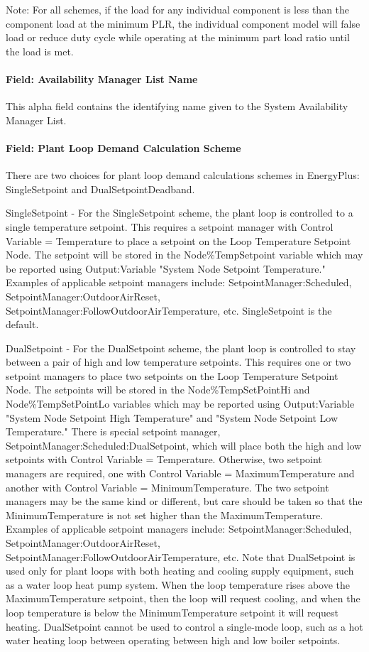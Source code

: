 Note: For all schemes, if the load for any individual component is less than the component load at the minimum PLR, the individual component model will false load or reduce duty cycle while operating at the minimum part load ratio until the load is met.

\paragraph{Field: Availability Manager List Name}\label{field-availability-manager-list-name-000}

This alpha field contains the identifying name given to the System Availability Manager List.

\paragraph{Field: Plant Loop Demand Calculation Scheme}\label{field-plant-loop-demand-calculation-scheme}
There are two choices for plant loop demand calculations schemes in EnergyPlus: SingleSetpoint and DualSetpointDeadband. 

SingleSetpoint - For the SingleSetpoint scheme, the plant loop is controlled to a single temperature setpoint. This requires a setpoint manager with Control Variable = Temperature to place a setpoint on the Loop Temperature Setpoint Node. The setpoint will be stored in the Node\%TempSetpoint variable which may be reported using Output:Variable "System Node Setpoint Temperature." Examples of applicable setpoint managers include: SetpointManager:Scheduled, SetpointManager:OutdoorAirReset, SetpointManager:FollowOutdoorAirTemperature, etc. SingleSetpoint is the default.

DualSetpoint - For the DualSetpoint scheme, the plant loop is controlled to stay between a pair of high and low temperature setpoints. This requires one or two setpoint managers to place two setpoints on the Loop Temperature Setpoint Node. The setpoints will be stored in the Node\%TempSetPointHi and Node\%TempSetPointLo variables which may be reported using Output:Variable "System Node Setpoint High Temperature" and "System Node Setpoint Low Temperature." There is special setpoint manager, SetpointManager:Scheduled:DualSetpoint, which will place both the high and low setpoints with Control Variable = Temperature. Otherwise, two setpoint managers are required, one with Control Variable = MaximumTemperature and another with Control Variable = MinimumTemperature. The two setpoint managers may be the same kind or different, but care should be taken so that the MinimumTemperature is not set higher than the MaximumTemperature. Examples of applicable setpoint managers include: SetpointManager:Scheduled, SetpointManager:OutdoorAirReset, SetpointManager:FollowOutdoorAirTemperature, etc. Note that DualSetpoint is used only for plant loops with both heating and cooling supply equipment, such as a water loop heat pump system. When the loop temperature rises above the MaximumTemperature setpoint, then the loop will request cooling, and when the loop temperature is below the MinimumTemperature setpoint it will request heating. DualSetpoint cannot be used to control a single-mode loop, such as a hot water heating loop between operating between high and low boiler setpoints.

